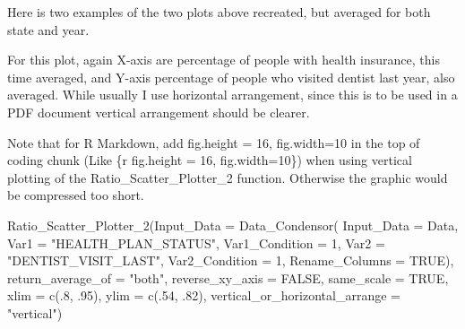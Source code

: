 \documentclass[
]{article}
\newenvironment{Shaded}{\begin{snugshade}}{\end{snugshade}}
\newcommand{\AttributeTok}[1]{\textcolor[rgb]{0.77,0.63,0.00}{#1}}
\newcommand{\ConstantTok}[1]{\textcolor[rgb]{0.00,0.00,0.00}{#1}}
\newcommand{\DecValTok}[1]{\textcolor[rgb]{0.00,0.00,0.81}{#1}}
\newcommand{\FunctionTok}[1]{\textcolor[rgb]{0.00,0.00,0.00}{#1}}
\newcommand{\NormalTok}[1]{#1}
\newcommand{\StringTok}[1]{\textcolor[rgb]{0.31,0.60,0.02}{#1}}
\begin{document}
Here is two examples of the two plots above recreated, but averaged for
both state and year.

For this plot, again X-axis are percentage of people with health
insurance, this time averaged, and Y-axis percentage of people who
visited dentist last year, also averaged. While usually I use horizontal
arrangement, since this is to be used in a PDF document vertical
arrangement should be clearer.

Note that for R Markdown, add fig.height = 16, fig.width=10 in the top
of coding chunk (Like \{r fig.height = 16, fig.width=10\}) when using
vertical plotting of the Ratio\_Scatter\_Plotter\_2 function. Otherwise
the graphic would be compressed too short.

\begin{Shaded}
\begin{Highlighting}[]
\FunctionTok{Ratio\_Scatter\_Plotter\_2}\NormalTok{(}\AttributeTok{Input\_Data =} \FunctionTok{Data\_Condensor}\NormalTok{(}
  \AttributeTok{Input\_Data =}\NormalTok{ Data, }\AttributeTok{Var1 =} \StringTok{"HEALTH\_PLAN\_STATUS"}\NormalTok{, }
  \AttributeTok{Var1\_Condition =} \DecValTok{1}\NormalTok{, }
  \AttributeTok{Var2 =} \StringTok{"DENTIST\_VISIT\_LAST"}\NormalTok{, }
  \AttributeTok{Var2\_Condition =} \DecValTok{1}\NormalTok{, }\AttributeTok{Rename\_Columns =} \ConstantTok{TRUE}\NormalTok{),}
  \AttributeTok{return\_average\_of =} \StringTok{"both"}\NormalTok{,}
  \AttributeTok{reverse\_xy\_axis =} \ConstantTok{FALSE}\NormalTok{,}
  \AttributeTok{same\_scale =} \ConstantTok{TRUE}\NormalTok{,}
  \AttributeTok{xlim =} \FunctionTok{c}\NormalTok{(.}\DecValTok{8}\NormalTok{, .}\DecValTok{95}\NormalTok{),}
  \AttributeTok{ylim =} \FunctionTok{c}\NormalTok{(.}\DecValTok{54}\NormalTok{, .}\DecValTok{82}\NormalTok{),}
  \AttributeTok{vertical\_or\_horizontal\_arrange =} \StringTok{"vertical"}\NormalTok{)}
\end{Highlighting}
\end{Shaded}
\end{document}
